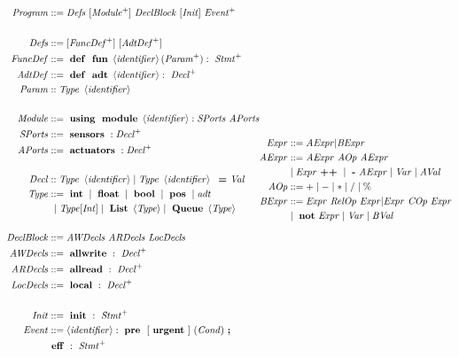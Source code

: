 \begin{figure}[H]
\scriptsize
\begin{align*}
\begin{split}
\pgm &::= \defs\ [\im]\ \db\ [\init]\ \evnts\  \\\\
\defs &::= [\fdefs^+]\ [\adefs^+]\\
\fdefs &::= \mterm{def}\mterm{fun} \id ( \params ):\ \stmts\\  
\adefs &::= \mterm{def}\mterm{adt} \id :\ \decls\\
\param &:: \type\ \id \\\\
\mathit{Module} &::= \mterm{using}\mterm{module}\id : \sports\ \aports\\
\sports &::= \mterm{sensors}:\decls \\ 
\aports &::= \mterm{actuators}:\decls\\\\
\decl &:: \type\ \id \mid \type\ \id \ \mterm{=} \val \\
\type &::= \mterm{int}\mid \mterm{float}\mid\mterm{bool}\mid \mterm{pos}\mid \mathit{adt} \\ &\ \mid \type [\mathit{Int}]\mid \mterm{List}\left\langle\type\right\rangle \mid \mterm{Queue}\left\langle\type\right\rangle\\\\
\db &::= \awd\ \ard\ \ld\\
\awd &::= \mterm{allwrite}:\ \decls\\ 
\ard &::= \mterm{allread}:\ \decls\\ 
\ld &::= \mterm{local}:\ \decls\\\\
\init &::= \mterm{init}:\ \stmts\\
\evnt &::= \id: \mterm{pre}\ [\mterm{urgent}]\ (\cnd)\mterm{;} \\ 
	& \mterm{eff}:\ \stmts\\
\end{split}\begin{split}
\expr &::= \aexpr | \bexpr \\
\aexpr &::= \aexpr\ \mathit{AOp}\ \aexpr\\  
&\mid \expr \mterm{++} \mid \mterm{-} \aexpr \mid \var \mid \aval \\
\mathit{AOp} &::= +\mid-\mid*\mid /\mid\% \\ 
\bexpr &::=  \expr\ \mathit{RelOp}\ \expr | \expr\ \mathit{COp}\ \expr\\
&\mid \mterm{not} \expr \mid \var\mid \bval\\

\end{split}
\end{align*}
\end{figure}
